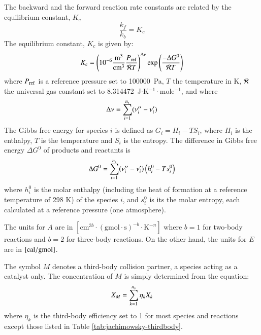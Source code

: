 \documentclass{warpdoc}
\newcommand{\ns}{{{n}_{\rm s}}}
\begin{document}
The backward and the forward reaction rate constants are related by the
equilibrium constant, $K_c$
%
\begin{equation}
\frac{k_f}{k_b} = K_c
\end{equation}
%
The equilibrium constant, $K_c$ is given by:
%
\begin{equation}
K_c = \left(10^{-6} \frac{\rm m^3}{\rm cm^3}\frac{P_{\rm ref}}{{\cal R} T}\right)^{\Delta \nu}
       \exp \left( \frac{-\Delta G^0}{{\cal R} T} \right)
\end{equation}
%
where $P_{\rm ref}$ is a reference pressure set to 100000~Pa, $T$ the temperature in K, $\cal R$ the universal gas constant set to 8.314472~J$\cdot$K$^{-1}\cdot$mole$^{-1}$,  and where
%
\begin{equation}
\Delta \nu = \sum_{i=1}^{\ns} (\nu''_i - \nu'_i)
\end{equation}
%
The Gibbs free energy for species $i$ is defined as $G_i = H_i - T S_i$, where $H_i$ is the enthalpy, $T$ is the temperature and $S_i$ is the entropy. The difference in Gibbs free energy $\Delta G^0$ of products and reactants is
%
\begin{equation}
\Delta G^0 = \sum_{i=1}^{\ns} (\nu''_i - \nu'_i) \left( h^0_i - T s^0_i \right)
\end{equation}
%
where $h^0_i$ is the molar enthalpy (including the heat of formation at a
reference temperature of 298 K)
of the species $i$, and $s^0_i$ is its the molar entropy,
each calculated at a reference pressure (one atmosphere).



The units for $A$ are in $[\textrm{cm}^{3b}\cdot (\textrm{gmol}\cdot \textrm{s})^{-b} \cdot \textrm{K}^{-n} ]$ where $b=1$ for two-body reactions and 
$b=2$ for three-body reactions. On the other hand, the units for $E$ are in $[\rm {cal}/{gmol}]$.

The symbol $M$ denotes a third-body collision partner, a species acting as a catalyst only.
The concentration of $M$ is simply determined from the equation:
%
\begin{equation}
X_M = \sum_{k=1}^{\ns} \eta_k X_k
\end{equation}
%
where $\eta_k$ is the third-body efficiency set to 1
for most species and reactions except those listed in Table 
\ref{tab:jachimowsky-thirdbody}.
\end{document}
